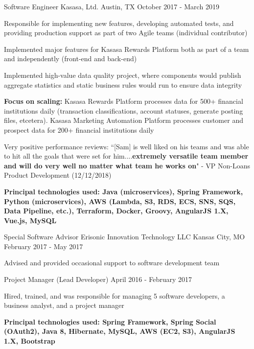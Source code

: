 \begin{cventries}
  \cventry
    {Software Engineer} %
    {Kasasa, Ltd.} %
    {Austin, TX} %
    {October 2017 - March 2019} %
    {
      \begin{cvitems} %
         \item{Responsible for implementing new features, developing automated tests, and providing production support as part of two Agile teams (individual contributor)}
 \item{Implemented major features for Kasasa Rewards Platform both as part of a team and independently (front-end and back-end)}
 \item{Implemented high-value data quality project, where components would publish aggregate statistics and static business rules would run to ensure data integrity}
 \item{\textbf{Focus on scaling:} Kasasa Rewards Platform processes data for 500+ financial institutions daily (transaction classifications, account statuses, generate posting files, etcetera). Kasasa Marketing Automation Platform processes customer and prospect data for 200+ financial institutions daily}
 \item{Very positive performance reviews: ``[Sam] is well liked on his teams and was able to hit all the goals that were set for him....\textbf{extremely versatile team member and will do very well no matter what team he works on}" - VP Non-Loans Product Development (12/12/2018)}
 \item{\textbf{Principal technologies used: Java (microservices), Spring Framework, Python (microservices), AWS (Lambda, S3, RDS, ECS, SNS, SQS, Data Pipeline, etc.), Terraform, Docker, Groovy, AngularJS 1.X, Vue.js, MySQL}}
      \end{cvitems}
    }

  \cventry
    {Special Software Advisor} %
    {Erisonic Innovation Technology LLC} %
    {Kansas City, MO} %
    {February 2017 - May 2017} %
    {
      \begin{cvitems} %
       \item {Advised and provided occasional support to software development team}
      \end{cvitems}
    }
    
      \cventry
    {Project Manager (Lead Developer)} %
    {} %
    {} %
    {April 2016 - February 2017} %
    {
      \begin{cvitems} %
         \item{Hired, trained, and was responsible for managing 5 software developers, a business analyst, and a project manager}
 \item{\textbf{Principal technologies used: Spring Framework, Spring Social (OAuth2), Java 8, Hibernate,
MySQL, AWS (EC2, S3), AngularJS 1.X, Bootstrap}}
      \end{cvitems}
    }


\end{cventries}
